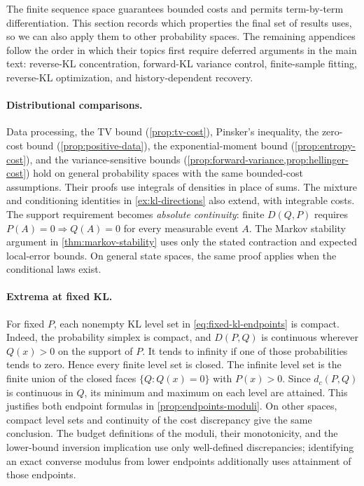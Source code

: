 \documentclass[11pt,twoside]{article}
\newcommand{\KL}{D}
\theoremstyle{definition}
\theoremstyle{remark}
\begin{document}
The finite sequence space guarantees bounded costs and permits
term-by-term differentiation. This section records which properties the
final set of results uses, so we can also apply them to other probability
spaces. The remaining appendices follow the order in which their topics first
require deferred arguments in the main text: reverse-KL concentration,
forward-KL variance control, finite-sample fitting, reverse-KL optimization,
and history-dependent recovery.

\paragraph{Distributional comparisons.}
Data processing, the TV bound (\cref{prop:tv-cost}), Pinsker's inequality,
the zero-cost bound (\cref{prop:positive-data}), the exponential-moment
bound (\cref{prop:entropy-cost}), and the variance-sensitive bounds
(\cref{prop:forward-variance,prop:hellinger-cost}) hold on general
probability spaces with the same bounded-cost assumptions. Their proofs
use integrals of densities in place of sums. The mixture and conditioning
identities in \cref{ex:kl-directions} also extend, with integrable costs.
The support requirement becomes \emph{absolute continuity}:
finite \(\KL(Q, P)\) requires
\(P(A)=0\Rightarrow Q(A)=0\) for every measurable event \(A\).
The Markov stability argument in \cref{thm:markov-stability} uses only
the stated contraction and expected local-error bounds. On general
state spaces, the same proof applies when the conditional laws exist.

\paragraph{Extrema at fixed KL.}
For fixed \(P\), each nonempty KL level set in
\cref{eq:fixed-kl-endpoints} is compact. Indeed, the probability simplex
is compact, and \(\KL(P, Q)\) is continuous wherever
\(Q(x)>0\) on the support of \(P\). It tends to infinity if one of
those probabilities tends to zero. Hence every finite level set is
closed. The infinite level set is the finite union of the closed faces
\(\{Q:Q(x)=0\}\) with \(P(x)>0\). Since \(d_c(P,Q)\) is
continuous in \(Q\), its minimum and maximum on each level are attained.
This justifies both endpoint formulas in \cref{prop:endpoints-moduli}.
On other spaces, compact level sets and continuity of the cost
discrepancy give the same conclusion. The budget definitions of the
moduli, their monotonicity, and the lower-bound inversion implication
use only well-defined discrepancies; identifying an exact converse
modulus from lower endpoints additionally uses attainment of those
endpoints.
\end{document}
